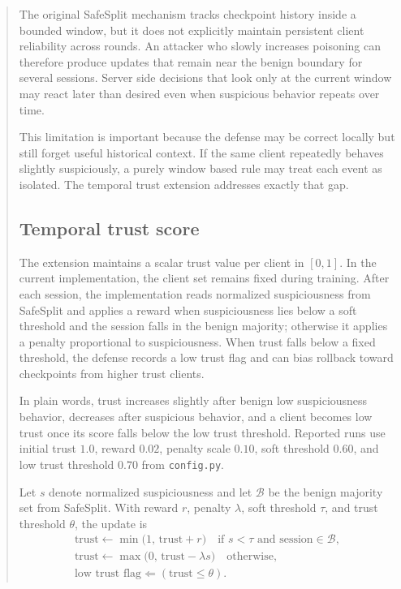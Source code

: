 \documentclass{article}
\begin{document}
\begin{abstract}
The original SafeSplit mechanism tracks checkpoint history inside a bounded window, but it does not explicitly maintain persistent client reliability across rounds. An attacker who slowly increases poisoning can therefore produce updates that remain near the benign boundary for several sessions. Server side decisions that look only at the current window may react later than desired even when suspicious behavior repeats over time.

This limitation is important because the defense may be correct locally but still forget useful historical context. If the same client repeatedly behaves slightly suspiciously, a purely window based rule may treat each event as isolated. The temporal trust extension addresses exactly that gap.

\subsection{Temporal trust score}

The extension maintains a scalar trust value per client in $[0,1]$. In the current implementation, the client set remains fixed during training. After each session, the implementation reads normalized suspiciousness from SafeSplit and applies a reward when suspiciousness lies below a soft threshold and the session falls in the benign majority; otherwise it applies a penalty proportional to suspiciousness. When trust falls below a fixed threshold, the defense records a low trust flag and can bias rollback toward checkpoints from higher trust clients.

In plain words, trust increases slightly after benign low suspiciousness behavior, decreases after suspicious behavior, and a client becomes low trust once its score falls below the low trust threshold. Reported runs use initial trust $1.0$, reward $0.02$, penalty scale $0.10$, soft threshold $0.60$, and low trust threshold $0.70$ from \texttt{config.py}.

Let $s$ denote normalized suspiciousness and let $\mathcal{B}$ be the benign majority set from SafeSplit. With reward $r$, penalty $\lambda$, soft threshold $\tau$, and trust threshold $\theta$, the update is
\[
\begin{array}{l}
\mathrm{trust} \leftarrow \min\bigl(1,\, \mathrm{trust}+r\bigr)
\quad \text{if } s < \tau \text{ and session} \in \mathcal{B}, \\[2pt]
\mathrm{trust} \leftarrow \max\bigl(0,\, \mathrm{trust}-\lambda s\bigr)
\quad \text{otherwise,} \\[2pt]
\text{low trust flag} \Leftarrow (\mathrm{trust} \le \theta).
\end{array}
\]


\end{abstract}
\end{document}

